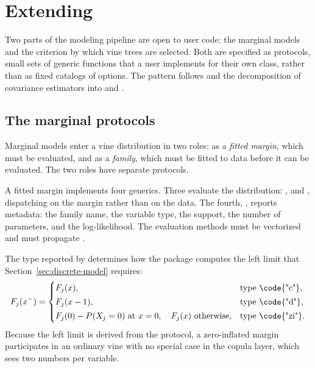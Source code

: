 \documentclass[article]{jss}
\begin{document}
\section[Extending rvinecopulib]{Extending }\label{sec:extend}

Two parts of the modeling pipeline are open to user code: the marginal models
and the criterion by which vine trees are selected.  Both are specified as
protocols, small sets of generic functions that a user implements for their
own class, rather than as fixed catalogs of options.  The pattern follows
 \citep{theussl2020} and the  decomposition of
covariance estimators into  and 
\citep{zeileis2006}.

\subsection{The marginal protocols}\label{sec:margin-protocol}

Marginal models enter a vine distribution in two roles: as a \emph{fitted
margin}, which must be evaluated, and as a \emph{family}, which must be fitted
to data before it can be evaluated.  The two roles have separate protocols.

A fitted margin implements four generics.  Three evaluate the distribution:
,  and , dispatching on the
margin rather than on the data.  The fourth, ,
reports metadata: the family name, the variable type, the support, the number
of parameters, and the log-likelihood.  The evaluation methods must be
vectorized and must propagate .

The type reported by  determines how the package computes
the left limit that Section~\ref{sec:discrete-model} requires:
\begin{equation}\label{eq:leftlimit}
  F_j(x^-) =
  \begin{cases}
    F_j(x), & \text{type \code{"c"}},\\[2pt]
    F_j(x - 1), & \text{type \code{"d"}},\\[2pt]
    F_j(0) - P(X_j = 0) \text{ at } x = 0, \quad F_j(x) \text{ otherwise},
      & \text{type \code{"zi"}}.
  \end{cases}
\end{equation}
Because the left limit is derived from the protocol, a zero-inflated margin
participates in an ordinary vine with no special case in the copula layer,
which sees two numbers per variable.
\end{document}
